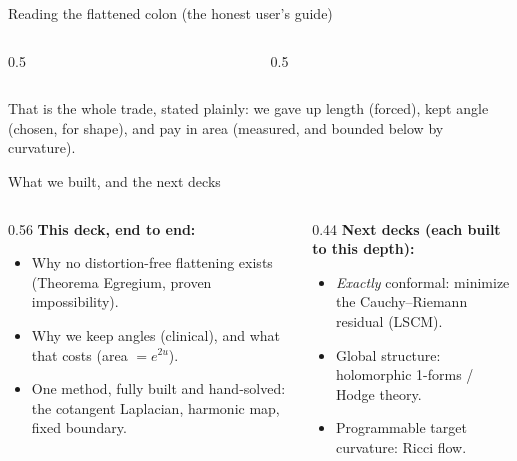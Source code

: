 \documentclass[aspectratio=169,10pt]{beamer}
\begin{document}
\begin{frame}{Reading the flattened colon (the honest user's guide)}
  \begin{columns}[T]
    \begin{column}{0.5\textwidth}
    \end{column}
    \begin{column}{0.5\textwidth}
    \end{column}
  \end{columns}
  \medskip
  That is the whole trade, stated plainly: we gave up length (forced), kept angle (chosen, for shape), and pay in area (measured, and bounded below by curvature).
\end{frame}


\begin{frame}{What we built, and the next decks}
  \begin{columns}[T]
    \begin{column}{0.56\textwidth}
      \textbf{This deck, end to end:}
      \begin{itemize}
        \item Why no distortion-free flattening exists (Theorema Egregium, proven impossibility).
        \item Why we keep angles (clinical), and what that costs (area $=e^{2u}$).
        \item One method, fully built and hand-solved: the cotangent Laplacian, harmonic map, fixed boundary.
      \end{itemize}
    \end{column}
    \begin{column}{0.44\textwidth}
      \textbf{Next decks (each built to this depth):}
      \begin{itemize}
        \item \emph{Exactly} conformal: minimize the Cauchy--Riemann residual (LSCM).
        \item Global structure: holomorphic 1-forms / Hodge theory.
        \item Programmable target curvature: Ricci flow.
      \end{itemize}
    \end{column}
  \end{columns}
\end{frame}
\end{document}
